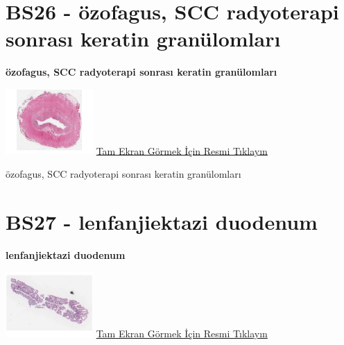\documentclass[
  letterpaper,
  DIV=11,
  numbers=noendperiod]{scrreprt}
\begin{document}
\hypertarget{sec-BS26}{%
\section{BS26 - özofagus, SCC radyoterapi sonrası keratin
granülomları}\label{sec-BS26}}

\textbf{özofagus, SCC radyoterapi sonrası keratin granülomları}

\href{https://images.patolojiatlasi.com/BS26/HE.html}{\includegraphics[width=0.25\textwidth,height=\textheight]{./screenshots/thumbnail_BS26-HE.png}}
\href{https://images.patolojiatlasi.com/BS26/HE.html}{Tam Ekran Görmek
İçin Resmi Tıklayın}

\begin{tcolorbox}[enhanced jigsaw, breakable, opacitybacktitle=0.6, arc=.35mm, colbacktitle=quarto-callout-tip-color!10!white, colback=white, toptitle=1mm, left=2mm, opacityback=0, colframe=quarto-callout-tip-color-frame, titlerule=0mm, rightrule=.15mm, bottomrule=.15mm, toprule=.15mm, bottomtitle=1mm, title=\textcolor{quarto-callout-tip-color}{\faLightbulb}\hspace{0.5em}{Tanı}, coltitle=black, leftrule=.75mm]

özofagus, SCC radyoterapi sonrası keratin granülomları

\end{tcolorbox}

\hypertarget{sec-BS27}{%
\section{BS27 - lenfanjiektazi duodenum}\label{sec-BS27}}

\textbf{lenfanjiektazi duodenum}

\href{https://images.patolojiatlasi.com/BS27/HE.html}{\includegraphics[width=0.25\textwidth,height=\textheight]{./screenshots/thumbnail_BS27-HE.png}}
\href{https://images.patolojiatlasi.com/BS27/HE.html}{Tam Ekran Görmek
İçin Resmi Tıklayın}
\end{document}
